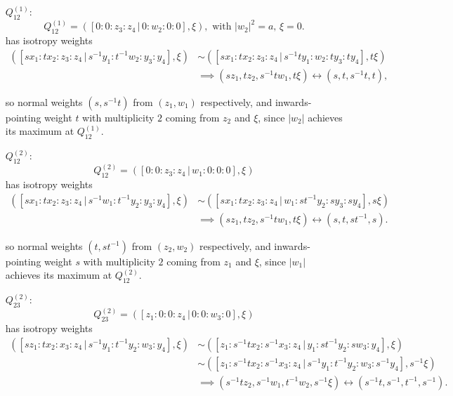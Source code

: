 \documentclass{article}
\begin{document}
	\begin{itemize}
		\item[$Q_{12}^{(1)}$:]
		\[
			Q_{12}^{(1)} = \left( [ 0 : 0 : z_{3} : z_{4} \, | \, 0 : w_{2} : 0 : 0 ], \xi \right), \text{ with } |w_{2}|^{2} = a,\, \xi = 0.
		\]
		has isotropy weights
		\begin{align*}
			\left( [sx_{1} : tx_{2} : z_{3} : z_{4} \, | \, s^{-1}y_{1} : t^{-1}w_{2} : y_{3} : y_{4}], \xi \right) &\sim \left( [sx_{1} : tx_{2} : z_{3} : z_{4} \, | \, s^{-1}ty_{1} : w_{2} : ty_{3} : ty_{4}], t\xi \right) \\ &\implies (sz_{1}, tz_{2}, s^{-1}tw_{1}, t\xi) \longleftrightarrow (s, t, s^{-1}t, t),
		\end{align*}
	
		so normal weights $(s, s^{-1}t)$ from $(z_{1}, w_{1})$ respectively, and inwards-pointing weight $t$ with multiplicity $2$ coming from $z_{2}$ and $\xi$, since $|w_{2}|$ achieves its maximum at $Q_{12}^{(1)}$.
	
		\item[$Q_{12}^{(2)}$:]
		\[
			Q_{12}^{(2)} = \left( [ 0 : 0 : z_{3} : z_{4} \, | \, w_{1} : 0 : 0 : 0 ], \xi \right)
		\]
		has isotropy weights
		\begin{align*}
			\left( [sx_{1} : tx_{2} : z_{3} : z_{4} \, | \, s^{-1}w_{1} : t^{-1}y_{2} : y_{3} : y_{4}], \xi \right) &\sim \left( [sx_{1} : tx_{2} : z_{3} : z_{4} \, | \, w_{1} : st^{-1}y_{2} : sy_{3} : sy_{4}], s\xi \right) \\ &\implies (sz_{1}, tz_{2}, s^{-1}tw_{1}, t\xi) \longleftrightarrow (s, t, st^{-1}, s).
		\end{align*}
	
		so normal weights $(t, st^{-1})$ from $(z_{2}, w_{2})$ respectively, and inwards-pointing weight $s$ with multiplicity $2$ coming from $z_{1}$ and $\xi$, since $|w_{1}|$ achieves its maximum at $Q_{12}^{(2)}$.
		
		\todo{}
	
		\item[$Q_{23}^{(2)}$:]
		\[
		Q_{23}^{(2)} = \left( [ z_{1} : 0 : 0 : z_{4} \, | \, 0 : 0 : w_{3} : 0 ], \xi \right)
		\]
		has isotropy weights
		\begin{align*}
			\left( [sz_{1} : tx_{2} : x_{3} : z_{4} \, | \, s^{-1}y_{1} : t^{-1}y_{2} : w_{3} : y_{4}], \xi \right) &\sim \left( [z_{1} : s^{-1}tx_{2} : s^{-1}x_{3} : z_{4} \, | \, y_{1} : st^{-1}y_{2} : sw_{3} : y_{4} ], \xi \right) \\ &\sim \left( [z_{1} : s^{-1}tx_{2} : s^{-1}x_{3} : z_{4} \, | \, s^{-1}y_{1} : t^{-1}y_{2} : w_{3} : s^{-1}y_{4} ], s^{-1}\xi \right) \\ &\implies (s^{-1}tz_{2}, s^{-1}w_{1}, t^{-1}w_{2}, s^{-1}\xi) \longleftrightarrow (s^{-1}t, s^{-1}, t^{-1}, s^{-1}).
		\end{align*}
	

\end{itemize}
\end{document}
